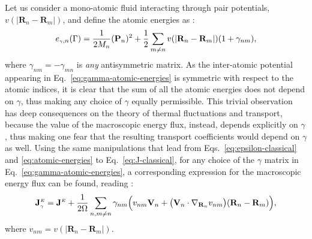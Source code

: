 Let us consider a mono-atomic fluid interacting through pair potentials, $v(|\mathbf{R}_n-\mathbf{R}_m|)$, and define the atomic energies as \cite{Marcolongo2014,Ercole2016}:
\begin{equation}
  e_{\smallgamma,n}(\rGamma) =
  \frac{1}{2M_n}(\mathbf{P}_{n})^{2} + \frac{1}{2}\sum_{m\ne n}
  v(|\mathbf{R}_{n}-\mathbf{R}_{m}|)
  (1+\gamma_{nm}), \label{eq:gamma-atomic-energies}
\end{equation}
where $\gamma_{nm}=-\gamma_{mn}$ is \emph{any} antisymmetric matrix.
As the inter-atomic potential appearing in Eq.~\eqref{eq:gamma-atomic-energies} is symmetric with respect to the atomic indices, it is clear that the sum of all the atomic energies does not depend on $\gamma$, thus making any choice of $\gamma$ equally permissible. This trivial observation has deep consequences on the theory of thermal fluctuations and transport, because the value of the macroscopic energy flux, instead, depends explicitly on $\gamma$, thus making one fear that the resulting transport coefficients would depend on $\gamma$ as well. Using the same manipulations that lead from Eqs.~\eqref{eq:epsilon-classical} and \eqref{eq:atomic-energies} to Eq.~\eqref{eq:J-classical}, for any choice of the $\gamma$ matrix in Eq.~\eqref{eq:gamma-atomic-energies}, a corresponding expression for the macroscopic energy flux can be found, reading \cite{Marcolongo2014,Ercole2016}:
\begin{equation}
  \mathbf{J}_{\smallgamma}^\smallE=\mathbf{J}^\smallE+
  \frac{1}{2 \rOmega}\sum_{n,m\ne n}\gamma_{nm} \Bigl ( v_{nm} \mathbf{V}_{n} + \bigl (\mathbf{V}_{n}\cdot \nabla_{\mathbf{R}_n} v_{nm} \bigr )  (\mathbf{R}_{n}-\mathbf{R}_{m}) \Bigr ), \label{eq:gamma-classical-current}
\end{equation}
where $v_{nm}= v(|\mathbf{R}_{n} - \mathbf{R}_{m}|)$.

